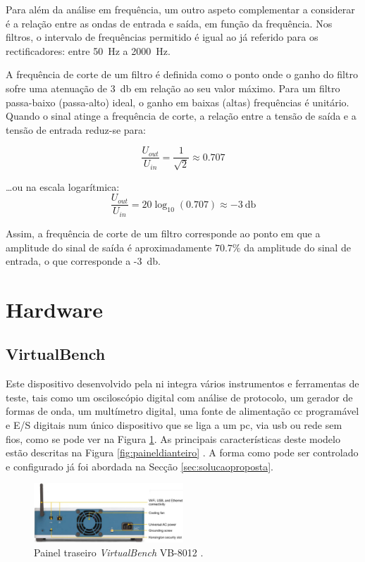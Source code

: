 	Para além da análise em frequência, um outro aspeto complementar a considerar é a relação entre as ondas de entrada e saída, em função da frequência. Nos filtros, o intervalo de frequências permitido é igual ao já referido para os rectificadores: entre \SI{50}{\hertz} a \SI{2000}{\hertz}. 
	
	A frequência de corte de um filtro é definida como o ponto onde o ganho do filtro sofre uma atenuação de \SI{3}{\decibel} em relação ao seu valor máximo. 	Para um filtro passa-baixo (passa-alto) ideal, o ganho em baixas (altas) frequências é unitário. Quando o sinal atinge a frequência de corte, a relação entre a tensão de saída e a tensão de entrada reduz-se para:  
	
	\begin{equation} \label{eq:relacaoGanho}
		\frac{U_{out}}{U_{in}} = \frac{1}{\sqrt{2}} \approx 0.707
	\end{equation}
	
	\ldots ou na escala logarítmica:  
\begin{equation} \label{eq:relacaoGanhodB}
	\frac{U_{out}}{U_{in}} = 20 \log_{10} (0.707) \approx -\SI{3}{\decibel}	
\end{equation}
	
Assim, a frequência de corte de um filtro corresponde ao ponto em que a amplitude do sinal de saída é aproximadamente $70.7\%$ da amplitude do sinal de entrada, o que corresponde a -\SI{3}{\decibel}. 

\section{Hardware}
\label{sec:hardware}
\subsection{VirtualBench}
Este dispositivo desenvolvido pela \acrshort{ni} integra vários instrumentos e ferramentas de teste, tais como um osciloscópio digital com análise de protocolo, um gerador de formas de onda, um multímetro digital, uma fonte de alimentação \acrfull{cc} programável e E/S digitais num único dispositivo que se liga a um \acrshort{pc}, via \acrshort{usb} ou rede sem fios, como se pode ver na Figura \ref{fig:paineltraseiro}. As principais características deste modelo estão descritas na Figura \ref{fig:paineldianteiro} \cite{datasheetVirtualBench}. A forma como pode ser controlado e configurado já foi abordada na Secção \ref{sec:solucaoproposta}.

\begin{figure}[hbtp]
    \centering
    \centering
    \includegraphics[width=0.5\textwidth]{figures/virtualbench_back-panel.jpg}
    \caption{Painel traseiro \textit{VirtualBench} VB-8012  \cite{datasheetVirtualBench}.}
    \label{fig:paineltraseiro}
\end{figure}

